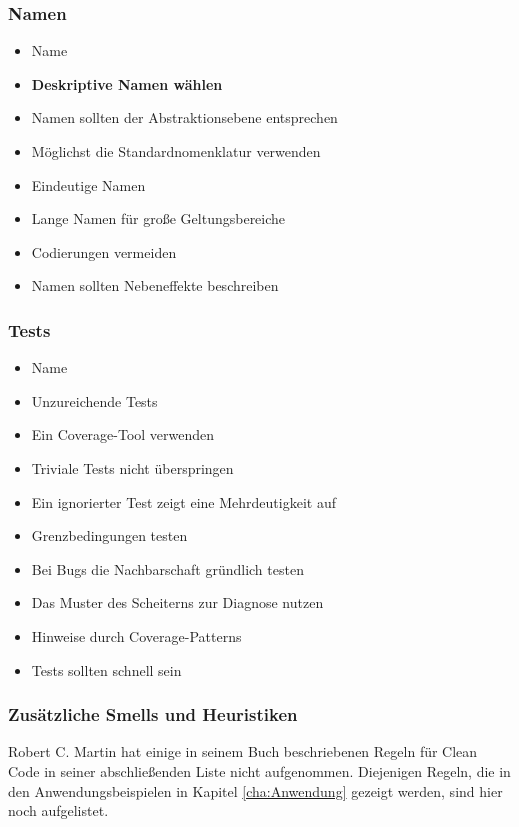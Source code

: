 \subsubsection{Namen}

\begin{itemize}
			\item Name
			\item \textbf{Deskriptive Namen wählen}
			\item Namen sollten der Abstraktionsebene entsprechen 
			\item Möglichst die Standardnomenklatur verwenden 
			\item Eindeutige Namen 
			\item Lange Namen für große Geltungsbereiche 
			\item Codierungen vermeiden 
			\item Namen sollten Nebeneffekte beschreiben
\end{itemize}

\subsubsection{Tests}

\begin{itemize}
	\item Name 
	\item Unzureichende Tests 
	\item Ein Coverage-Tool verwenden 
	\item Triviale Tests nicht überspringen 
	\item Ein ignorierter Test zeigt eine Mehrdeutigkeit auf 
	\item Grenzbedingungen testen 
	\item Bei Bugs die Nachbarschaft gründlich testen 
	\item Das Muster des Scheiterns zur Diagnose nutzen 
	\item Hinweise durch Coverage-Patterns 
	\item Tests sollten schnell sein 
\end{itemize}

\subsubsection{Zusätzliche Smells und Heuristiken}
Robert C. Martin hat einige in seinem Buch beschriebenen Regeln für Clean Code in seiner abschließenden Liste nicht aufgenommen. Diejenigen Regeln, die in den Anwendungsbeispielen in Kapitel \ref{cha:Anwendung} gezeigt werden, sind hier noch aufgelistet.

